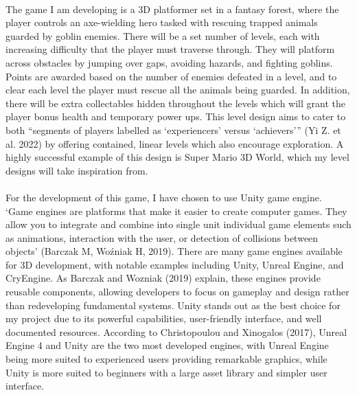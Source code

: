 \documentclass[12pt]{article}
\begin{document}
\paragraph{}
The game I am developing is a 3D platformer set in a fantasy forest, where the player controls an axe-wielding hero tasked with rescuing trapped animals guarded by goblin enemies. There will be a set number of levels, each with increasing difficulty that the player must traverse through. They will platform across obstacles by jumping over gaps, avoiding hazards, and fighting goblins. Points are awarded based on the number of enemies defeated in a level, and to clear each level the player must rescue all the animals being guarded. In addition, there will be extra collectables hidden throughout the levels which will grant the player bonus health and temporary power ups. This level design aims to cater to both ``segments of players labelled as `experiencers' versus `achievers''' (Yi Z. et al. 2022) by offering contained, linear levels which also encourage exploration. A highly successful example of this design is Super Mario 3D World, which my level designs will take inspiration from.
\paragraph{}
For the development of this game, I have chosen to use Unity game engine. `Game engines are platforms that make it easier to create computer games. They allow you to integrate and combine into single unit individual game elements such as animations, interaction with the user, or detection of collisions between objects' (Barczak M, Woźniak H, 2019). There are many game engines available for 3D development, with notable examples including Unity, Unreal Engine, and CryEngine. As Barczak and Wozniak (2019) explain, these engines provide reusable components, allowing developers to focus on gameplay and design rather than redeveloping fundamental systems. Unity stands out as the best choice for my project due to its powerful capabilities, user-friendly interface, and well documented resources. According to Christopoulou and Xinogalos (2017), Unreal Engine 4 and Unity are the two most developed engines, with Unreal Engine being more suited to experienced users providing remarkable graphics, while Unity is more suited to beginners with a large asset library and simpler user interface.
\end{document}
